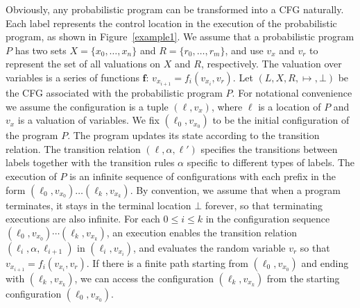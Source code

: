 \documentclass[conference]{IEEEtran}
\begin{document}
Obviously, any probabilistic program can be transformed into a CFG naturally. Each label represents the control location in the execution of the probabilistic program, as shown in Figure~\ref{example1}. 
We assume that a probabilistic program $P$ has two sets $X=\{x_0,\dots,x_{n}\}$ and $R=\{r_0,\dots,r_{m}\}$, and use $v_x$ and $v_r$ to represent the set of all valuations on $X$ and $R$, respectively. The valuation over variables is a series of functions $\bm{f}$: $v_{x_{i+1}}=f_i(v_{x_{i}}, v_r)$.  
Let $(L,X,R,\mapsto,\bot)$ be the CFG associated with the probabilistic program $P$. For notational convenience we assume the configuration is a tuple $(\ell, v_x)$, where $\ell$ is a location of $P$ and $v_x$ is a valuation of variables.
We fix $(\ell_0, v_{x_0})$ to be the initial configuration of the program $P$. The program updates its state according to the transition relation. The transition relation $(\ell,\alpha,\ell')$ specifies the transitions between labels together with the transition rules $\alpha$ specific to different types of labels.
The execution of $P$ is an infinite sequence of configurations with each prefix in the form $(\ell_0, v_{x_0}) \dots (\ell_k, v_{x_k})$. By convention, we assume that when a program terminates, it stays in the terminal location $\bot$ forever, so that terminating executions are also infinite. 
For each $0\leq i\leq k$ in the configuration sequence $(\ell_0,v_{x_0}) \cdots (\ell_k, v_{x_k})$, an execution enables the transition relation $(\ell_i, \alpha, \ell_{i+1})$ in $(\ell_i, v_{x_i})$, and evaluates the random variable $v_r$ so that $v_{x_{i+1}}=f_i(v_{x_i},v_r)$. If there is a finite path starting from $(\ell_0, v_{x_0})$ and ending with $(\ell_k, v_{x_k})$, we can access the configuration $(\ell_k, v_{x_k})$ from the starting configuration $(\ell_0, v_{x_0})$. 
\end{document}
